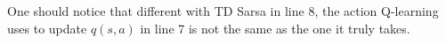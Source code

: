 \documentclass{progartcn}
\begin{document}
            One should notice that different with TD Sarsa in line 8, the action Q-learning uses to update $q(s,a)$ in line 7 is not the same as the one it truly takes.\\
			\begin{comment}
            The comparison of Sarsa and Q-Learning is shown as follows:

            Sarsa: On-Policy TD control
            \begin{itemize}[noitemsep,topsep=0pt]
            	\item Choose action $A_t$ from $S_t$ using policy derived from $Q$ with $\varepsilon$-greedy;
            	\item Take action $A_t$, observe $R_{t+1}$ and $S_{t+1}$;
            	\item Choose action $A_{t+1}$ from $S_{t+1}$ using policy derived from $Q$ with $\varepsilon$-greedy;
            	\item $Q(S_t,A_t)\gets Q(S_t,A_t)+\alpha[R_{t+1}+\gamma Q(S_{t+1},A_{t+1})-Q(S_t,A_t)]$.
            \end{itemize}

            Q-Learning: Off-Policy TD control
            \begin{itemize}[noitemsep,topsep=0pt]
            	\item Choose action $A_t$ from $S_t$ using policy derived from $Q$ with $\varepsilon$-greedy;
            	\item Take action $A_t$, observe $R_{t+1}$ and $S_{t+1}$;
            	\item 'Imagine' $A_{t+1}$ as $\arg\max_{a'}Q(S_{t+1},a')$ in the update target; 
            	\item $Q(S_t,A_t)\gets Q(S_t,A_t)+\alpha[R_{t+1}+\gamma \max_{a'}Q(S_{t+1},a')-Q(S_t,A_t)]$.
            \end{itemize}
            		\subsection{Off-Policy Monte-Carlo Control: Importance Sampling}

			Off-Policy control allows us to learn from observing humans or other agents, re-use experience generated from old policies $\pi_1,\pi_2,...,\pi_t$, learn about optimal policy while following exploratory policy and learn about multiple policies while following one policy.

			\textbf{Importance Sampling for Off-Policy Monte-Carlo}: \textit{Let $G_t$ be the returns generated from $\mu$. Define the corrected return}
			\[G_t^{\pi/\mu}=\frac{\pi(A_t|S_t)\pi(A_{t+1}|S_{t+1})...\pi(A_{\tau}|S_{\tau})}{\mu(A_t|S_t)\mu(A_{t+1}|S_{t+1})...\mu(A_{\tau}|S_{\tau})}G_t,\]
			\textit{then we update value by the corrected return}
			\[V(S_t)\gets V(S_t)+\alpha(G_t^{\pi/\mu}-V(S_t)).\]


\end{comment}
\end{document}
